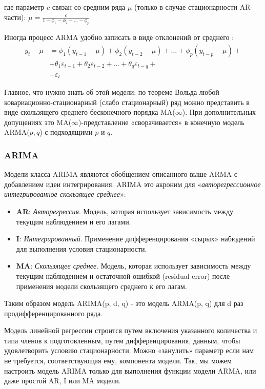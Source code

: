 где параметр $c$ связан со средним ряда $\mu$ (только в случае стационарности AR-части): 
$\mu = \frac{c}{1 - \phi_1 - \phi_2 - \dots - \phi_p}$

Иногда процесс ARMA удобно записать в виде отклонений от среднего \cite{TSA_Hamilton}:
\begin{align*}
    y_t - \mu &= \phi_1 (y_{t-1} - \mu) + \phi_2 (y_{t-2} - \mu) + \dots + \phi_p (y_{t-p} - \mu) + \\ 
    &+ \theta_1 \varepsilon_{t-1} + \theta_2 \varepsilon_{t-2} + \dots + \theta_q \varepsilon_{t-q} + \\
    &+ \varepsilon_t
\end{align*}

Главное, что нужно знать об этой модели: по теореме Вольда любой ковариационно-стационарный (слабо стационарный) 
ряд можно представить в виде скользящего среднего бесконечного порядка MA($\infty$). При дополнительных допущениях 
это MA($\infty$)-представление «сворачивается» в
конечную модель ARMA(\(p,q\)) с подходящими \(p\) и \(q\).

\subsubsection{ARIMA}

Модели класса ARIMA являются обобщением описанного выше ARMA с добавлением идеи интегрирования. ARIMA это 
акроним для «\textit{авторегрессионное интегрированное скользящее среднее}»\cite{Forecasting_Brownlee}:
\begin{itemize}
    \item \textbf{AR}: \textit{Авторегрессия}. Модель, которая использует зависимость между текущим наблюдением и его лагами. \\[-1em]
    \item \textbf{I}: \textit{Интегрированный}. Применение дифференцирования «сырых» набюдений для выполнения условия стационарности. \\[-1em]
    \item \textbf{MA}: \textit{Скользящее среднее}. Модель, которая использует зависимость между текущим наблюдением и остаточной ошибкой (residual error) после применения модели скользящего среднего к его лагам.
\end{itemize}

Таким образом модель ARIMA(p, d, q) - это модель ARMA(p, q) для d раз продифференцированного ряда. 

Модель линейной регрессии строится путем включения указанного количества и типа членов к подготовленным, путем 
дифференцирования, данным, чтобы удовлетворить условию стационарности. Можно «занулить» параметр если нам не 
требуется, соответствующая ему, компонента модели. Так, мы можем настроить модель ARIMA только для выполнения 
функции модели ARMA, или даже простой AR, I или MA модели. 

